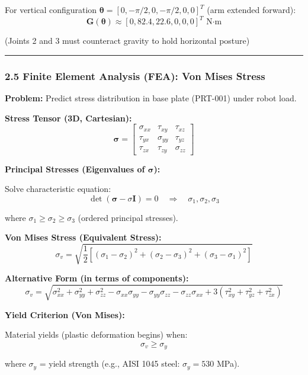 \documentclass[
]{article}
\begin{document}
For vertical configuration
\(\boldsymbol{\theta} = [0, -\pi/2, 0, -\pi/2, 0, 0]^T\) (arm extended
forward): \[
\mathbf{G}(\boldsymbol{\theta}) \approx [0, 82.4, 22.6, 0, 0, 0]^T \text{ N·m}
\]

(Joints 2 and 3 must counteract gravity to hold horizontal posture)

\begin{center}\rule{0.5\linewidth}{0.5pt}\end{center}

\hypertarget{finite-element-analysis-fea-von-mises-stress}{%
\subsubsection{2.5 Finite Element Analysis (FEA): Von Mises
Stress}\label{finite-element-analysis-fea-von-mises-stress}}

\textbf{Problem:} Predict stress distribution in base plate (PRT-001)
under robot load.

\textbf{Stress Tensor (3D, Cartesian):} \[
\boldsymbol{\sigma} =
\begin{bmatrix}
\sigma_{xx} & \tau_{xy} & \tau_{xz} \\
\tau_{yx} & \sigma_{yy} & \tau_{yz} \\
\tau_{zx} & \tau_{zy} & \sigma_{zz}
\end{bmatrix}
\]

\textbf{Principal Stresses (Eigenvalues of \(\boldsymbol{\sigma}\)):}

Solve characteristic equation: \[
\det(\boldsymbol{\sigma} - \sigma \mathbf{I}) = 0 \quad \Rightarrow \quad \sigma_1, \sigma_2, \sigma_3
\]

where \(\sigma_1 \geq \sigma_2 \geq \sigma_3\) (ordered principal
stresses).

\textbf{Von Mises Stress (Equivalent Stress):} \[
\sigma_v = \sqrt{\frac{1}{2} \left[ (\sigma_1 - \sigma_2)^2 + (\sigma_2 - \sigma_3)^2 + (\sigma_3 - \sigma_1)^2 \right]}
\]

\textbf{Alternative Form (in terms of components):} \[
\sigma_v = \sqrt{\sigma_{xx}^2 + \sigma_{yy}^2 + \sigma_{zz}^2 - \sigma_{xx}\sigma_{yy} - \sigma_{yy}\sigma_{zz} - \sigma_{zz}\sigma_{xx} + 3(\tau_{xy}^2 + \tau_{yz}^2 + \tau_{zx}^2)}
\]

\textbf{Yield Criterion (Von Mises):}

Material yields (plastic deformation begins) when: \[
\sigma_v \geq \sigma_y
\]

where \(\sigma_y\) = yield strength (e.g., AISI 1045 steel:
\(\sigma_y = 530\) MPa).
\end{document}
